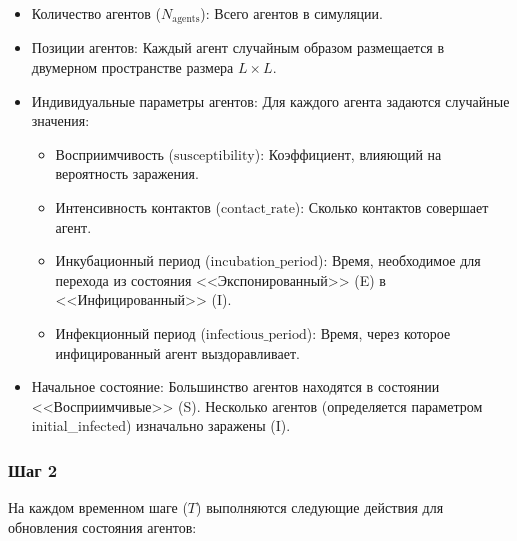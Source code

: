 \documentclass[a4paper, 14pt]{extreport}
\begin{document}
	\begin{itemize}
		\item {Количество агентов ($N_{\text{agents}}$)}: Всего агентов в симуляции.
		\item {Позиции агентов}: Каждый агент случайным образом размещается в двумерном пространстве размера $L \times L$.
		\item {Индивидуальные параметры агентов}: Для каждого агента задаются случайные значения:
		\begin{itemize}
			\item {Восприимчивость ($\text{susceptibility}$)}: Коэффициент, влияющий на вероятность заражения.
			\item {Интенсивность контактов ($\text{contact\_rate}$)}: Сколько контактов совершает агент.
			\item {Инкубационный период ($\text{incubation\_period}$)}: Время, необходимое для перехода из состояния <<Экспонированный>> (E) в <<Инфицированный>> (I).
			\item {Инфекционный период ($\text{infectious\_period}$)}: Время, через которое инфицированный агент выздоравливает.
		\end{itemize}
		\item {Начальное состояние}: Большинство агентов находятся в состоянии <<Восприимчивые>> (S). Несколько агентов (определяется параметром\\ initial\_infected) изначально заражены (I).
	\end{itemize}
	
	\subsubsection*{Шаг 2}
	
	На каждом временном шаге ($T$) выполняются следующие действия для обновления состояния агентов:
	
\end{document}
